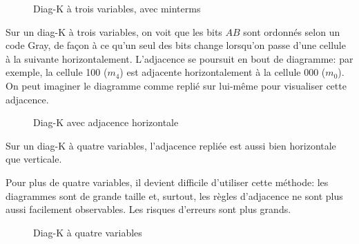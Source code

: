 \documentclass[letter, oneside]{book}
\begin{document}
\begin{figure}[htbp]
\centering

\caption{\label{fig:orgfccefad}Diag-K à trois variables, avec minterms}
\end{figure}

Sur un diag-K à trois variables, on voit que les bits \(AB\) sont
ordonnés selon un code Gray, de façon à ce qu'un seul des bits change
lorsqu'on passe d'une cellule à la suivante
horizontalement. L'adjacence se poursuit en bout de diagramme: par
exemple, la cellule 100 (\(m_4\)) est adjacente horizontalement à la
cellule 000 (\(m_0\)). On peut imaginer le diagramme comme replié sur
lui-même pour visualiser cette adjacence.

\begin{figure}[htbp]
\centering

\caption{\label{fig:org752fa38}Diag-K avec adjacence horizontale}
\end{figure}

Sur un diag-K à quatre variables, l'adjacence repliée est aussi bien horizontale
que verticale.

Pour plus de quatre variables, il devient difficile d'utiliser cette
méthode: les diagrammes sont de grande taille et, surtout, les règles
d'adjacence ne sont plus aussi facilement observables. Les risques
d'erreurs sont plus grands.

\begin{figure}[htbp]
\centering

\caption{\label{fig:org9013843}Diag-K à quatre variables}
\end{figure}
\end{document}
